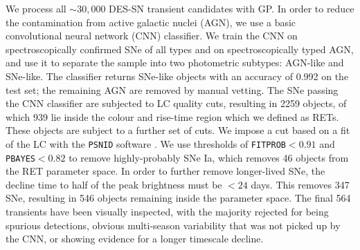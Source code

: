 \documentclass[fleqn,usenatbib,]{mnras}
\begin{document}
We process all $\sim 30,000$ DES-SN transient candidates with GP. In order to reduce the contamination from active galactic nuclei (AGN), we use a basic convolutional neural network (CNN) classifier. We train the CNN on spectroscopically confirmed SNe of all types and on spectroscopically typed AGN, and use it to separate the sample into two photometric subtypes: AGN-like and SNe-like. The classifier returns SNe-like objects with an accuracy of 0.992 on the test set; the remaining AGN are removed by manual vetting.
The SNe passing the CNN classifier are subjected to LC quality cuts, resulting in 2259 objects, of which 939 lie inside the colour and rise-time region which we defined as RETs. These objects are subject to a further set of cuts. We impose a cut based on a fit of the LC with the \texttt{PSNID} software \citep{Sako2008}. We use thresholds of \texttt{FITPROB}$<0.91$ and \texttt{PBAYES}$<0.82$ to remove highly-probably SNe Ia, which removes 46 objects from the RET parameter space. In order to further remove longer-lived SNe, the decline time to half of the peak brightness must be $<24$ days. This removes 347 SNe, resulting in 546 objects remaining inside the parameter space. The final 564 transients have been visually inspected, with the majority rejected for being spurious detections, obvious multi-season variability that was not picked up by the CNN, or showing evidence for a longer timescale decline. 
\end{document}
